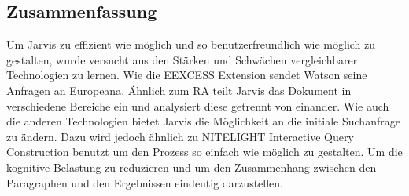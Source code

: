 \subsection{Zusammenfassung}
Um Jarvis zu effizient wie möglich und so benutzerfreundlich wie möglich zu gestalten, wurde versucht aus den Stärken und Schwächen vergleichbarer Technologien zu lernen. Wie die EEXCESS Extension sendet Watson seine Anfragen an Europeana. Ähnlich zum RA teilt Jarvis das Dokument in verschiedene Bereiche ein und analysiert diese getrennt von einander. Wie auch die anderen Technologien bietet Jarvis die Möglichkeit an die initiale Suchanfrage zu ändern. Dazu wird jedoch ähnlich zu NITELIGHT Interactive Query Construction benutzt um den Prozess so einfach wie möglich zu gestalten. Um die kognitive Belastung zu reduzieren und um den Zusammenhang zwischen den Paragraphen und den Ergebnissen eindeutig darzustellen.